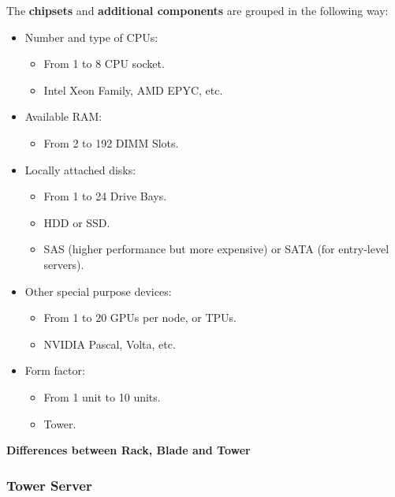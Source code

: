 \highspace
The \textbf{chipsets} and \textbf{additional components} are grouped in the following way:
\begin{itemize}
    \item Number and type of CPUs:
    \begin{itemize}
        \item From 1 to 8 CPU socket.
        \item Intel Xeon Family, AMD EPYC, etc.
    \end{itemize}

    \item Available RAM:
    \begin{itemize}
        \item From 2 to 192 DIMM Slots.
    \end{itemize}

    \item Locally attached disks:
    \begin{itemize}
        \item From 1 to 24 Drive Bays. 
        \item HDD or SSD.
        \item SAS (higher performance but more expensive) or SATA (for entry-level servers).
    \end{itemize}

    \item Other special purpose devices:
    \begin{itemize}
        \item From 1 to 20 GPUs per node, or TPUs.
        \item NVIDIA Pascal, Volta, etc.
    \end{itemize}
    
    \item Form factor:
    \begin{itemize}
        \item From 1 unit to 10 units.
        \item Tower.
    \end{itemize}
\end{itemize}

\newpage

\begin{center}
    \textcolor{Red2}{\textbf{Differences between Rack, Blade and Tower}}
\end{center}

\subsubsection*{Tower Server}


